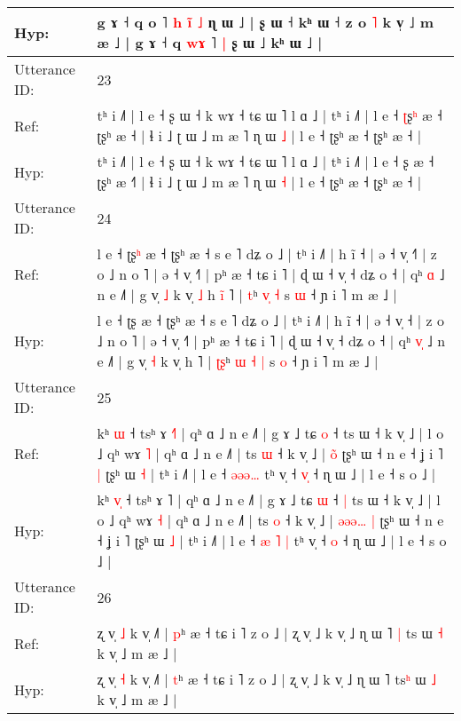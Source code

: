 \documentclass[10pt]{article}
\DeclareRobustCommand{\hl}[1]{{\textcolor{red}{#1}}}
\begin{document}
\begin{longtable}{ll}
 \\
Hyp: & g ɤ ˧ q o ˥\hl{ }\hl{h}\hl{ }\hl{i}\hl{̃}\hl{ }\hl{˩} ɳ ɯ ˩ | ʂ ɯ ˧ kʰ ɯ ˧ z o \hl{˥} k v̩ ˩ m æ ˩ | g ɤ ˧ q \hl{w}\hl{ɤ} ˥\hl{ }\hl{|} ʂ ɯ ˩ kʰ ɯ ˩ |
 \\
\midrule
Utterance ID: & 23 \\
Ref: & tʰ i ˩˥ | l e ˧ ʂ ɯ ˧ k wɤ ˧ tɕ ɯ ˥ l ɑ ˩ | tʰ i ˩˥ | l e ˧ \hl{ʈ}ʂ\hl{ʰ} æ ˧ ʈʂʰ æ ˧\hl{} | ɬ i ˩ ʈ ɯ ˩ m æ ˥ ɳ ɯ \hl{˩} | l e ˧ ʈʂʰ æ ˧ ʈʂʰ æ ˧ |
 \\
Hyp: & tʰ i ˩˥ | l e ˧ ʂ ɯ ˧ k wɤ ˧ tɕ ɯ ˥ l ɑ ˩ | tʰ i ˩˥ | l e ˧ \hl{}ʂ\hl{} æ ˧ ʈʂʰ æ ˧\hl{˥} | ɬ i ˩ ʈ ɯ ˩ m æ ˥ ɳ ɯ \hl{˧} | l e ˧ ʈʂʰ æ ˧ ʈʂʰ æ ˧ |
 \\
\midrule
Utterance ID: & 24 \\
Ref: & l e ˧ ʈʂ\hl{ʰ} æ ˧ ʈʂʰ æ ˧ s e ˥ dʑ o ˩ | tʰ i ˩˥ | h ĩ ˧ | ə ˧ v̩ ˧\hl{˥} | z o ˩ n o ˥ | ə ˧ v̩ ˧˥ | pʰ æ ˧ tɕ i ˥ | ɖ ɯ ˧ v̩ ˧ dʑ o ˧ | qʰ \hl{}\hl{ɑ} ˩ n e ˩˥ | g v̩ \hl{˩} k v̩\hl{ }\hl{˩} h\hl{ }\hl{i}\hl{̃} ˥ | \hl{}\hl{t}ʰ \hl{}\hl{v}\hl{̩} \hl{˧} s \hl{ɯ} ˧ ɲ i ˥ m æ ˩ |
 \\
Hyp: & l e ˧ ʈʂ\hl{} æ ˧ ʈʂʰ æ ˧ s e ˥ dʑ o ˩ | tʰ i ˩˥ | h ĩ ˧ | ə ˧ v̩ ˧\hl{} | z o ˩ n o ˥ | ə ˧ v̩ ˧˥ | pʰ æ ˧ tɕ i ˥ | ɖ ɯ ˧ v̩ ˧ dʑ o ˧ | qʰ \hl{v}\hl{̩} ˩ n e ˩˥ | g v̩ \hl{˧} k v̩\hl{}\hl{} h\hl{}\hl{}\hl{} ˥ | \hl{ʈ}\hl{ʂ}ʰ \hl{ɯ}\hl{ }\hl{˧} \hl{|} s \hl{o} ˧ ɲ i ˥ m æ ˩ |
 \\
\midrule
Utterance ID: & 25 \\
Ref: & kʰ \hl{}\hl{ɯ} ˧ tsʰ ɤ \hl{˧}˥ | qʰ ɑ ˩ n e ˩˥ | g ɤ ˩ tɕ \hl{o} ˧\hl{}\hl{} ts ɯ ˧ k v̩ ˩ | l o ˩ qʰ wɤ \hl{˥} | qʰ ɑ ˩ n e ˩˥ | ts \hl{ɯ} ˧ k v̩ ˩ | \hl{}\hl{}\hl{}\hl{}\hl{o}\hl{̃} ʈʂʰ ɯ ˧ n e ˧ ʝ i ˥\hl{ }\hl{|} ʈʂʰ ɯ \hl{˧} | tʰ i ˩˥ | l e ˧ \hl{}\hl{ə}\hl{ə}\hl{ə}\hl{…} tʰ v̩ ˧ \hl{v}\hl{̩} ˧ ɳ ɯ ˩ | l e ˧ s o ˩ |
 \\
Hyp: & kʰ \hl{v}\hl{̩} ˧ tsʰ ɤ \hl{}˥ | qʰ ɑ ˩ n e ˩˥ | g ɤ ˩ tɕ \hl{ɯ} ˧\hl{ }\hl{|} ts ɯ ˧ k v̩ ˩ | l o ˩ qʰ wɤ \hl{˧} | qʰ ɑ ˩ n e ˩˥ | ts \hl{o} ˧ k v̩ ˩ | \hl{ə}\hl{ə}\hl{ə}\hl{…}\hl{ }\hl{|} ʈʂʰ ɯ ˧ n e ˧ ʝ i ˥\hl{}\hl{} ʈʂʰ ɯ \hl{˩} | tʰ i ˩˥ | l e ˧ \hl{æ}\hl{ }\hl{˥}\hl{ }\hl{|} tʰ v̩ ˧ \hl{}\hl{o} ˧ ɳ ɯ ˩ | l e ˧ s o ˩ |
 \\
\midrule
Utterance ID: & 26 \\
Ref: & ʐ v̩ \hl{˩} k v̩ ˩˥ | \hl{p}ʰ æ ˧ tɕ i ˥ z o ˩ | ʐ v̩ ˩ k v̩ ˩ ɳ ɯ ˥\hl{ }\hl{|} ts\hl{} ɯ \hl{˧} k v̩ ˩ m æ ˩ |
 \\
Hyp: & ʐ v̩ \hl{˧} k v̩ ˩˥ | \hl{t}ʰ æ ˧ tɕ i ˥ z o ˩ | ʐ v̩ ˩ k v̩ ˩ ɳ ɯ ˥\hl{}\hl{} ts\hl{ʰ} ɯ \hl{˩} k v̩ ˩ m æ ˩ |

\end{longtable}
\end{document}
